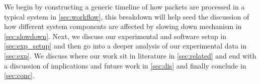 We begin by constructing a generic timeline of how packets are processed in a typical system in \cref{sec:workflow}, this breakdown will help seed the discussion of how different system components are affected by slowing down mechanism in \cref{sec:slowdown}. Next, we discuss our experimental and software setup in \cref{sec:exp_setup} and then go into a deeper analysis of our experimental data in \cref{sec:exp}. We discuss where our work sit in literature in \cref{sec:related} and end with a discussion of implications and future work in \cref{sec:dis} and finally conclude in \cref{sec:conc}. 

	
	


